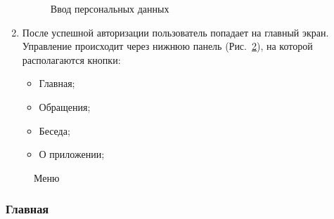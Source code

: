 \documentclass{../includes/TechDoc}
\begin{document}
\begin{enumerate}
\begin{figure}[h]
\begin{center}
\begin{minipage}[ht]{0.4\linewidth}
                    \caption{Ввод персональных данных}
                    \label{ris:personal_data}
                \end{minipage}
            \end{center}
        \end{figure}

        \item После успешной авторизации пользователь попадает на главный экран.
        Управление происходит через нижнюю панель (Рис.~\ref{fig:menu}), на которой располагаются кнопки:
        \begin{itemize}[noitemsep]
            \item Главная;
            \item Обращения;
            \item Беседа;
            \item О приложении;
        \end{itemize}
    \end{enumerate}

    \begin{figure}[ht]
        \centering
        \caption{Меню}
        \label{fig:menu}
    \end{figure}

    \clearpage

    \subsubsection{Главная}
\end{document}
